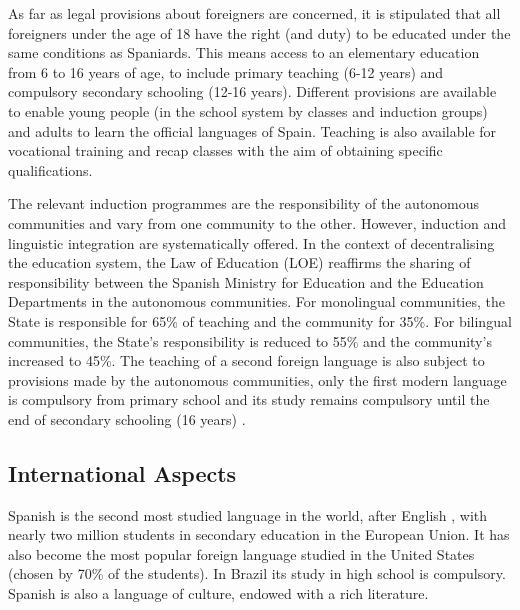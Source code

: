 \begin{multicols}{2}

As far as legal provisions about foreigners are concerned, it is stipulated that all foreigners under the age of 18 have the right (and duty) to be educated under the same conditions as Spaniards. This means access to an elementary education from 6 to 16 years of age, to include primary teaching (6-12 years) and compulsory secondary schooling (12-16 years). Different provisions are available to enable young people (in the school system by classes and induction groups) and adults to learn the official languages of Spain. Teaching is also available for vocational training and recap classes with the aim of obtaining specific qualifications.

The relevant induction programmes are the responsibility of the autonomous communities and vary from one community to the other. However, induction and linguistic integration are systematically offered. 
In the context of decentralising the education system, the Law of Education (LOE) reaffirms the sharing of responsibility between the Spanish Ministry for Education and the Education Departments in the autonomous communities. For monolingual communities, the State is responsible for 65\% of teaching and the community for 35\%. For bilingual communities, the State’s responsibility is reduced to 55\% and the community’s increased to 45\%. The teaching of a second foreign language is also subject to provisions made by the autonomous communities, only the first modern language is compulsory from primary school and its study remains compulsory until the end of secondary schooling (16 years) \cite{Efni1}.

\subsection{International Aspects}


Spanish is the second most studied language in the world, after English , with nearly two million students in secondary education in the European Union. It has also become the most popular foreign language studied in the United States (chosen by 70\% of the students). In Brazil its study in high school is compulsory. Spanish is also a language of culture, endowed with a rich literature. 


\end{multicols}

